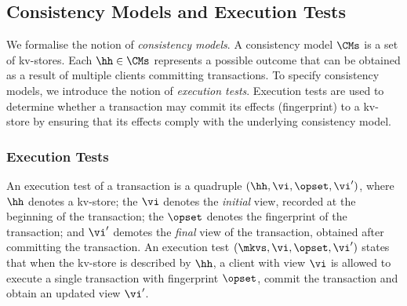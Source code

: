 \subsection{Consistency Models and Execution Tests}
We formalise the notion of \emph{consistency models}. 
A consistency model $\CMs$ is a set of kv-stores. 
Each $\hh \in \CMs$ represents a possible outcome that 
can be obtained as a result of multiple clients committing transactions. 
To specify consistency models, we introduce the notion of \emph{execution tests}. 
Execution tests are used to determine whether a transaction may commit its effects (fingerprint) to a kv-store by ensuring that its  effects comply with the underlying consistency model.

\subsubsection{Execution Tests}
An execution test of a transaction is a quadruple $(\hh, \vi, \opset, \vi')$, where $\hh$ denotes a kv-store;
the $\vi$ denotes the \emph{initial} view, recorded at the beginning of the transaction; 
the $\opset$ denotes the fingerprint of the transaction; and 
$\vi'$ demotes the \emph{final} view of the transaction, obtained after committing the transaction. 
An execution test $(\mkvs, \vi, \opset, \vi')$ states that when the kv-store is described by $\hh$, a client with view $\vi$ is allowed to execute a single transaction with fingerprint $\opset$, commit the transaction and obtain an updated view $\vi'$. 
%
%
%
%







